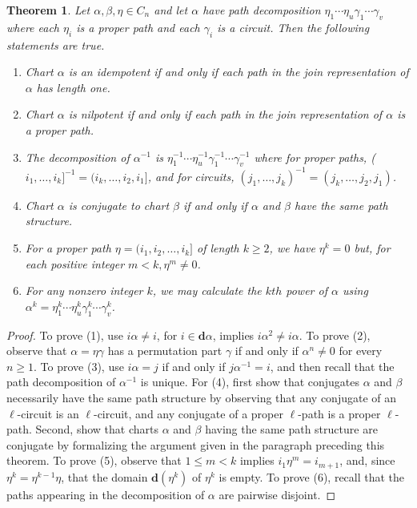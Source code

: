 \documentclass{surv-l}
\numberwithin{equation}{section}
\numberwithin{table}{section}
\numberwithin{figure}{section}
\theoremstyle{plain}
\newtheorem{theorem}[equation]{Theorem}
\theoremstyle{definition}
\begin{document}
\begin{theorem}\label{thm2.5.1}
Let $\alpha,\beta,\eta\in C_{n}$ and let $\alpha$ have path
decomposition $\eta_{1}\cdots\eta_{u}\gamma_{1}\cdots\gamma_{v}$
where each $\eta_{i}$ is a proper path and each $\gamma_{i}$ is a
circuit. Then the following statements are true.
\begin{enumerate}
\item[(1)] Chart $\alpha$ is an idempotent if and only if
each path in the join representation of $\alpha$ has length
one.

\item[(2)] Chart $\alpha$ is nilpotent if and only if each
path in the join representation of $\alpha$ is a proper path.

\item[(3)] The decomposition of $\alpha^{-1}$ is
$\eta_{1}^{-1}\cdots\eta_{u}^{-1}\gamma_{1}^{-1}\cdots\gamma_{v}^{-1}$
where for proper paths,
($i_{1},\ldots,i_{k}]^{-1}=(i_{k},\ldots, i_{2},i_{1}]$, and
for circuits, $(j_{1},\ldots,
j_{k})^{-1}=(j_{k},\ldots,j_{2},j_{1})$.

\item[(4)] Chart $\alpha$ is conjugate to chart $\beta$
if and only if $\alpha$ and $\beta$ have the same path
structure.

\item[(5)] For a proper path $\eta=(i_{1}, i_{2},\ldots, i_{k}]$
of length $k\geq 2$, we have $\eta^{k}=0$ but, for each
positive integer $m<k,\eta^{m}\neq 0$.

\item[(6)] For any nonzero integer $k$, we may calculate the
$kth$ power of $\alpha$ using
$\alpha^{k}=\eta_{1}^{k}\cdots\eta_{u}^{k}\gamma_{1}^{k}\cdots\gamma_{v}^{k}$.
\end{enumerate}
\end{theorem}

\begin{proof} To prove (1), use $i\alpha\neq i$, for $i\in
\mathbf{d}\alpha$, implies $ i\alpha^{2}\neq i\alpha$. To prove
(2), observe that $\alpha=\eta\gamma$ has a permutation part
$\gamma$ if and only if $\alpha^{n}\neq 0$ for every $n\geq 1$. To
prove (3), use $i\alpha=j$ if and only if $j\alpha^{-1}=i$, and
then recall that the path decomposition of $\alpha^{-1}$ is
unique. For (4), first show that conjugates $\alpha$ and $\beta$
necessarily have the same path structure by observing that any
conjugate of an $\ell$-circuit is an $\ell$-circuit, and any
conjugate of a proper $\ell$-path is a proper $\ell$-path. Second,
show that charts $\alpha$ and $\beta$ having the
same path structure are conjugate by formalizing the argument
given in the paragraph preceding this theorem. To prove (5),
observe that $1\leq m<k$ implies $i_{1}\eta^{m}=i_{m+1}$, and,
since $\eta^{k}=\eta^{k-1}\eta$, that the domain
$\mathbf{d}(\eta^{k})$ of $\eta^{k}$ is empty. To prove (6),
recall that the paths appearing in the decomposition of $\alpha$
are pairwise disjoint.
\end{proof}
\end{document}
